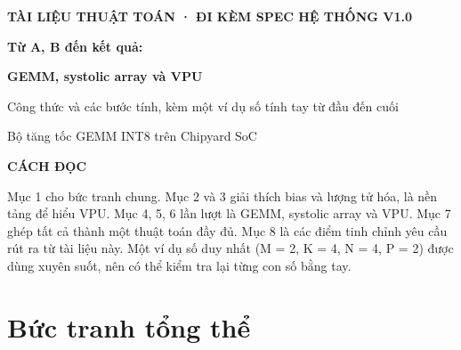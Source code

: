 \documentclass[10pt,a4paper]{article}
\begin{document}
\thispagestyle{empty}
\vspace*{3cm}
{\headfont\bfseries\small\color{brand}\MakeUppercase{Tài liệu thuật toán · đi kèm spec hệ thống v1.0}\par}
\vspace{0.6cm}
\hspace{0.45cm}\begin{minipage}[t]{0.9\linewidth}
{\headfont\bfseries\fontsize{28}{34}\selectfont\color{brand}Từ A, B đến kết quả:\par}
\vspace{4pt}
{\headfont\bfseries\fontsize{28}{34}\selectfont\color{brand}GEMM, systolic array và VPU\par}
\vspace{10pt}
{\large\color{ink}Công thức và các bước tính, kèm một ví dụ số tính tay từ đầu đến cuối\par}
\vspace{4pt}
{\normalsize\color{muted}Bộ tăng tốc GEMM INT8 trên Chipyard SoC\par}
\end{minipage}
\vfill
\begin{tcolorbox}[enhanced,colback=card,colframe=brandline,boxrule=0.6pt,arc=2pt,fontupper=\small,left=8pt,right=8pt]
{\headfont\bfseries\footnotesize\color{brand}CÁCH ĐỌC}\par\vspace{3pt}
Mục 1 cho bức tranh chung. Mục 2 và 3 giải thích bias và lượng tử hóa, là nền tảng để hiểu VPU. Mục 4, 5, 6 lần lượt là GEMM, systolic array và VPU. Mục 7 ghép tất cả thành một thuật toán đầy đủ. Mục 8 là các điểm tinh chỉnh yêu cầu rút ra từ tài liệu này. Một ví dụ số duy nhất (M = 2, K = 4, N = 4, P = 2) được dùng xuyên suốt, nên có thể kiểm tra lại từng con số bằng tay.
\end{tcolorbox}
\clearpage
\tableofcontents

\section{Bức tranh tổng thể}\label{sec:1}
\end{document}

